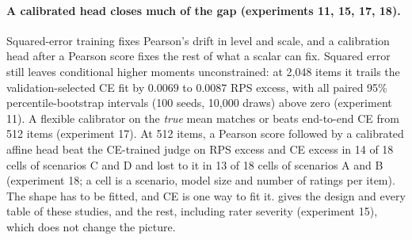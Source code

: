 \paragraph{A calibrated head closes much of the gap (experiments 11, 15, 17, 18).}
Squared-error training fixes Pearson's drift in level and scale, and a calibration head after a Pearson score fixes the rest of what a scalar can fix.
Squared error still leaves conditional higher moments unconstrained: at 2{,}048 items it trails the validation-selected CE fit by $0.0069$ to $0.0087$ RPS excess, with all paired 95\% percentile-bootstrap intervals (100 seeds, 10{,}000 draws) above zero (experiment 11).
A flexible calibrator on the \emph{true} mean matches or beats end-to-end CE from 512 items (experiment 17).
At 512 items, a Pearson score followed by a calibrated affine head beat the CE-trained judge on RPS excess and CE excess in 14 of 18 cells of scenarios C and D and lost to it in 13 of 18 cells of scenarios A and B (experiment 18; a cell is a scenario, model size and number of ratings per item).
The shape has to be fitted, and CE is one way to fit it.
 gives the design and every table of these studies, and  the rest, including rater severity (experiment 15), which does not change the picture.
